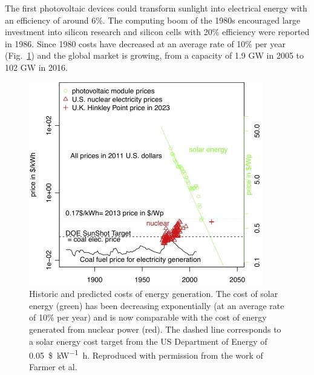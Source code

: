 The first photovoltaic devices could transform sunlight into electrical energy with an efficiency of around 6\%. The computing boom of the 1980s encouraged large investment into silicon research and  silicon cells with 20\% efficiency were reported in 1986.\autocite{Blakers1986} Since 1980 costs have decreased at an average rate of 10\% per year\autocite{Farmer2016} (Fig.\ \ref{module_price}) and the global market is growing, from a capacity of 1.9 GW in 2005 to 102 GW in 2016.\autocite{Jager-Waldau2017}

\begin{figure}[h]
\centering
  \includegraphics[width=0.6\columnwidth]{figures/ch1/solarcost.jpg}
  \caption[Historic and predicted costs of solar energy generation]{Historic and predicted costs of energy generation. The cost of solar energy (green) has been decreasing exponentially (at an average rate of 10\% per year) and is now comparable with the cost of energy generated from nuclear power (red). The dashed line corresponds to a  solar energy cost target from the US Department of Energy of \SI{0.05}{\$\per\kilo\watt\hour}. Reproduced with permission from the work of Farmer et al.\autocite{Farmer2016}}
  \label{module_price}
\end{figure}

